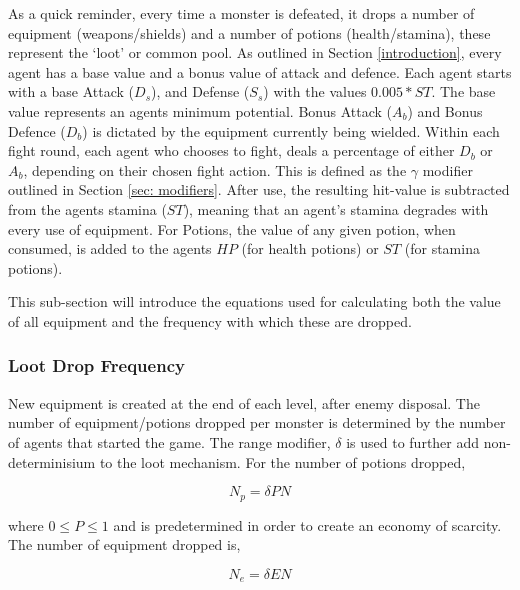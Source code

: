 As a quick reminder, every time a monster is defeated, it drops a number of equipment (weapons/shields) and a number of potions (health/stamina), these represent the `loot' or common pool. As outlined in Section \ref{introduction}, every agent has a base value and a bonus value of attack and defence. Each agent starts with a base Attack ($D_s$), and Defense ($S_s$) with the values $0.005*ST$. The base value represents an agents minimum potential.
Bonus Attack ($A_b$) and Bonus Defence ($D_b$) is dictated by the equipment currently being wielded. Within each fight round, each agent who chooses to fight, deals a percentage of either $D_b$ or $A_b$, depending on their chosen fight action. This is defined as the $\gamma$ modifier outlined in Section \ref{sec: modifiers}. After use, the resulting hit-value is subtracted from the agents stamina ($ST$), meaning that an agent's stamina degrades with every use of equipment. For Potions, the value of any given potion, when consumed, is added to the agents $HP$ (for health potions) or $ST$ (for stamina potions). 

This sub-section will introduce the equations used for calculating both the value of all equipment and the frequency with which these are dropped. 



\subsubsection{Loot Drop Frequency}

New equipment is created at the end of each level, after enemy disposal. The number of equipment/potions dropped per monster is determined by the number of agents that started the game. The range modifier, $\delta$ is used to further add non-determinisium to the loot mechanism. For the number of potions dropped,

\begin{equation}
    N_p = \delta P N
\end{equation}

where $0 \leq P \leq 1$ and is predetermined in order to create an economy of scarcity. The number of equipment dropped is,

\begin{equation}
    N_e = \delta E N
\end{equation}

